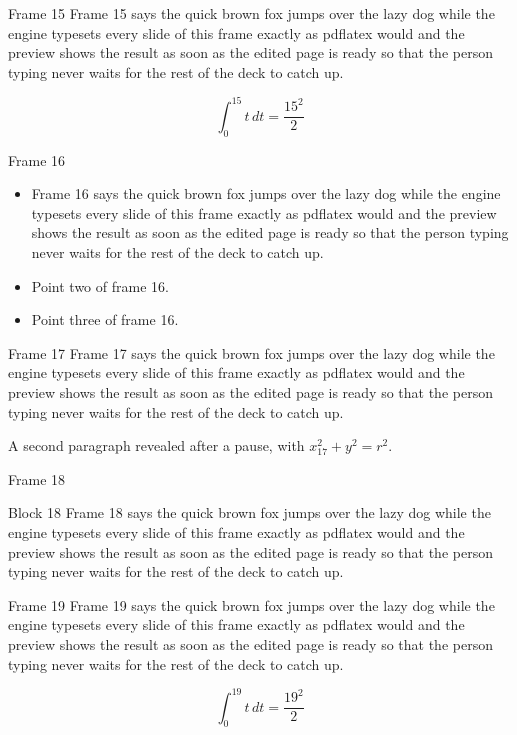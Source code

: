 \documentclass{beamer}
\begin{document}
\begin{frame}{Frame 15}
  Frame 15 says the quick brown fox jumps over the lazy dog while the engine typesets every slide of this frame exactly as pdflatex would and the preview shows the result as soon as the edited page is ready so that the person typing never waits for the rest of the deck to catch up.

  \[ \int_0^{15} t\,dt = \frac{15^2}{2} \]
\end{frame}
\begin{frame}{Frame 16}
  \begin{itemize}
    \item<1-> Frame 16 says the quick brown fox jumps over the lazy dog while the engine typesets every slide of this frame exactly as pdflatex would and the preview shows the result as soon as the edited page is ready so that the person typing never waits for the rest of the deck to catch up.
    \item<2-> Point two of frame 16.
    \item<3-> Point three of frame 16.
  \end{itemize}
\end{frame}
\begin{frame}{Frame 17}
  Frame 17 says the quick brown fox jumps over the lazy dog while the engine typesets every slide of this frame exactly as pdflatex would and the preview shows the result as soon as the edited page is ready so that the person typing never waits for the rest of the deck to catch up.
  \pause

  A second paragraph revealed after a pause, with $x_{17}^2 + y^2 = r^2$.
\end{frame}
\begin{frame}{Frame 18}
  \begin{block}{Block 18}
    Frame 18 says the quick brown fox jumps over the lazy dog while the engine typesets every slide of this frame exactly as pdflatex would and the preview shows the result as soon as the edited page is ready so that the person typing never waits for the rest of the deck to catch up.
  \end{block}
\end{frame}
\begin{frame}{Frame 19}
  Frame 19 says the quick brown fox jumps over the lazy dog while the engine typesets every slide of this frame exactly as pdflatex would and the preview shows the result as soon as the edited page is ready so that the person typing never waits for the rest of the deck to catch up.

  \[ \int_0^{19} t\,dt = \frac{19^2}{2} \]
\end{frame}
\end{document}
